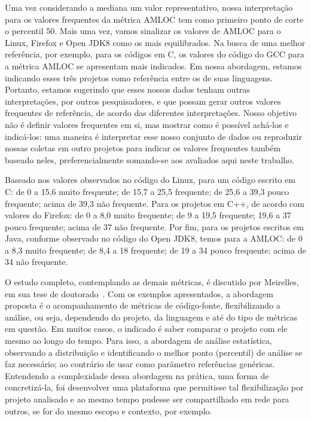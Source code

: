 \documentclass{llncs}
\begin{document}
Uma vez considerando a mediana um valor representativo, nossa interpretação
para os valores frequentes da métrica AMLOC tem como primeiro ponto de corte o
percentil 50.
%
Mais uma vez, vamos sinalizar os valores de AMLOC para o Linux, Firefox e Open
JDK8 como os mais equilibrados.
%
Na busca de uma melhor referência, por exemplo, para os códigos em C, os
valores do código do GCC para a métrica AMLOC se apresentam mais indicados.
%
Em nossa abordagem, estamos indicando esses três projetos como referência entre
os de suas linguagens.
%
Portanto, estamos sugerindo que esses nossos dados tenham outras
interpretações, por outros pesquisadores, e que possam gerar outros valores
frequentes de referência, de acordo das diferentes interpretações.
%
Nosso objetivo não é definir valores frequentes em si, mas mostrar como é
possível achá-los e indicá-los: uma maneira é interpretar esse nosso conjunto
de dados ou reproduzir nossas coletas em outro projetos para indicar os valores
frequentes também baseado neles, preferencialmente somando-se aos avaliados
aqui neste trabalho.

Baseado nos valores observados no código do Linux, para um código escrito em C:
de 0 a 15,6 muito frequente; de 15,7 a 25,5 frequente; de 25,6 a 39,3 pouco
frequente; acima de 39,3 não frequente.
%
Para os projetos em C++, de acordo com valores do Firefox: de 0 a 8,0 muito
frequente; de 9 a 19,5 frequente; 19,6 a 37 pouco frequente; acima de 37 não
frequente.
%
Por fim, para os projetos escritos em Java, conforme observado no código do
Open JDK8, temos para a AMLOC: de 0 a 8,3 muito frequente; de 8,4 a 18
frequente; de 19 a 34 pouco frequente; acima de 34 não frequente.

O estudo completo, contemplando as demais métricas, é discutido por Meirelles,
em sua tese de doutorado~\cite{meirelles2013monitoramento}. Com os exemplos
apresentados, a abordagem proposta é o acompanhamento de métricas de
código-fonte, flexibilizando a análise, ou seja, dependendo do projeto, da
linguagem e até do tipo de métricas em questão.
%
Em muitos casos, o indicado é saber comparar o projeto com ele mesmo ao longo
do tempo. Para isso, a abordagem de análise estatística, observando a
distribuição e identificando o melhor ponto (percentil) de análise se faz
necessário; ao contrário de usar como parâmetro referências genéricas.
Entendendo a complexidade dessa abordagem na prática, uma forma de
concretizá-la, foi desenvolver uma plataforma que permitisse tal flexibilização
por projeto analisado e ao mesmo tempo pudesse ser compartilhado em rede para
outros, se for do mesmo escopo e contexto, por exemplo.
\end{document}
